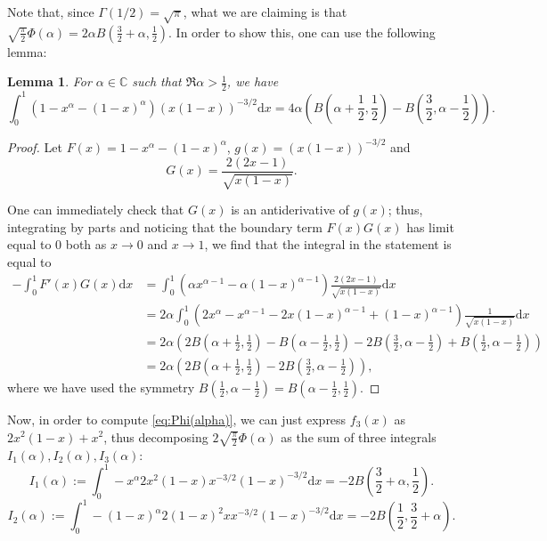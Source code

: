 \documentclass[11pt]{article}
\newcommand{\dd}{\mathrm{d}}
\newtheorem{lem}[thm]{Lemma}
\begin{document}
Note that, since $\Gamma(1/2)=\sqrt{\pi}$, what we are claiming is that $\sqrt{\frac{\pi}{2}}\Phi(\alpha)=2\alpha B( \frac{3}{2}+\alpha, \frac{1}{2} )$. In order to show this, one can use the following lemma:


\begin{lem}\label{lemma:MysteriousPiece}
For $\alpha\in\mathbb{C}$ such that $\Re \alpha > \frac{1}{2}$, we have
\[
\int_0^1 (1-x^\alpha-(1-x)^\alpha) (x(1-x))^{-3/2} \dd x = 4\alpha \left( B\left(\alpha+\frac{1}{2}, \frac{1}{2}\right)  -B\left(\frac{3}{2}, \alpha-\frac{1}{2}\right) \right).
\]
\end{lem}
\begin{proof}
    Let $F(x)=1-x^\alpha-(1-x)^\alpha$, $g(x)=(x(1-x))^{-3/2}$ and
    \[
        G(x) = \frac{2(2x-1)}{\sqrt{x(1-x)}}.
    \]

One can immediately check that $G(x)$ is an antiderivative of $g(x)$; 
    thus, integrating by parts and noticing that the boundary term $F(x)G(x)$ has limit equal to $0$ both as $x \to 0$ and $x \to 1$, we find that the integral in the statement is equal to
    \[
    \begin{aligned}
    -\int_0^1 F'(x) G(x) \dd x & =
\int_0^1 \left(\alpha x^{\alpha-1}-\alpha (1-x)^{\alpha-1}\right) \frac{2(2x-1)}{\sqrt{x(1-x)}} \dd x  \\
& = 2\alpha \int_0^1 \left( 2x^{\alpha} -x^{\alpha-1}-2x(1-x)^{\alpha-1} + (1-x)^{\alpha-1} \right) \frac{1}{\sqrt{x(1-x)}} \dd x \\
& = 2\alpha \left( 2B\left(\alpha+\frac{1}{2}, \frac{1}{2}\right) - B\left(\alpha-\frac{1}{2}, \frac{1}{2}\right) -2B\left(\frac{3}{2}, \alpha-\frac{1}{2}\right)+B\left(\frac{1}{2},\alpha-\frac{1}{2}\right) \right) \\
& = 2\alpha \left( 2B\left(\alpha+\frac{1}{2}, \frac{1}{2}\right)  -2B\left(\frac{3}{2}, \alpha-\frac{1}{2}\right) \right),
\end{aligned}
    \]
    where we have used the symmetry $B\left(\frac{1}{2},\alpha-\frac{1}{2}\right)=B\left(\alpha-\frac{1}{2}, \frac{1}{2}\right)$.
\end{proof}
Now, in order to compute \eqref{eq:Phi(alpha)}, we can just express $f_3(x)$ as $2x^2(1-x) + x^2$, thus decomposing $2\sqrt{\frac{\pi}{2}}\Phi(\alpha)$ as the sum of three integrals $I_1(\alpha), I_2(\alpha), I_3(\alpha)$:
\[
I_1(\alpha) := \int_0^1 -x^{\alpha} 2x^2 (1-x) x^{-3/2}(1-x)^{-3/2} \dd x = -2B\left(\frac{3}{2}+\alpha, \frac{1}2\right).
\]
\[
I_2(\alpha) := \int_0^1 -(1-x)^{\alpha} 2(1-x)^2 x x^{-3/2}(1-x)^{-3/2} \dd x = -2B\left(\frac{1}2, \frac{3}{2}+\alpha\right).
\]
\end{document}
